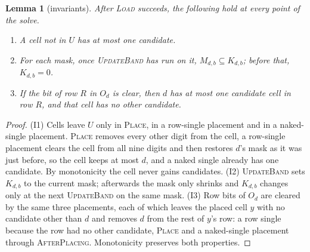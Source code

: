 \documentclass[11pt]{article}
\newtheorem{lemma}[theorem]{Lemma}
\theoremstyle{definition}
\theoremstyle{plain}
\let\origtextsc\textsc
\renewcommand{\textsc}[1]{\textup{\origtextsc{#1}}}
\begin{document}
\begin{lemma}[invariants]
\label{lem:invariants}
After \textsc{Load} succeeds, the following hold at every point of the solve.
\begin{enumerate}
\item[(I1)] A cell not in $U$ has at most one candidate.
\item[(I2)] For each mask, once \textsc{UpdateBand} has run on it, $M_{d,b}\subseteq K_{d,b}$; before that,
  $K_{d,b}=0$.
\item[(I3)] If the bit of row $R$ in $O_d$ is clear, then $d$ has at most one candidate cell in row $R$, and that cell
  has no other candidate.
\end{enumerate}
\end{lemma}
\begin{proof}
(I1) Cells leave $U$ only in \textsc{Place}, in a row-single placement and in a naked-single placement. \textsc{Place}
removes every other digit from the cell, a row-single placement clears the cell from all nine digits and then restores $d$'s mask as it was just before, so
the cell keeps at most $d$, and a naked single already has one candidate. By monotonicity the cell never gains candidates.
(I2) \textsc{UpdateBand} sets $K_{d,b}$ to the current mask; afterwards the mask only shrinks and $K_{d,b}$ changes only
at the next \textsc{UpdateBand} on the same mask. (I3) Row bits of $O_d$ are cleared by the same three placements, each
of which leaves the placed cell $y$ with no candidate other than $d$ and removes $d$ from the rest of $y$'s row: a row
single because the row had no other candidate, \textsc{Place} and a naked-single placement through
\textsc{AfterPlacing}. Monotonicity preserves both properties.
\end{proof}
\end{document}
